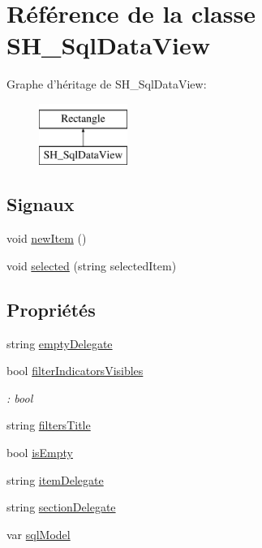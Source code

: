 \hypertarget{classSH__SqlDataView}{\section{Référence de la classe S\-H\-\_\-\-Sql\-Data\-View}
\label{classSH__SqlDataView}
}
Graphe d'héritage de S\-H\-\_\-\-Sql\-Data\-View\-:\begin{figure}[H]
\begin{center}
\leavevmode
\includegraphics[height=2.000000cm]{classSH__SqlDataView}
\end{center}
\end{figure}
\subsection*{Signaux}
\begin{DoxyCompactItemize}
\item 
void \hyperlink{classSH__SqlDataView_a8ce529551e776f86ee76d29da47f9914}{new\-Item} ()
\item 
void \hyperlink{classSH__SqlDataView_a95366e3f65b183e8c82381e90b5ddc94}{selected} (string selected\-Item)
\end{DoxyCompactItemize}
\subsection*{Propriétés}
\begin{DoxyCompactItemize}
\item 
string \hyperlink{classSH__SqlDataView_af2c0c75bb57606451699027fa74eeda2}{empty\-Delegate}
\item 
bool \hyperlink{classSH__SqlDataView_afdc0805dc2ce3af4e9ce5331a81d7e13}{filter\-Indicators\-Visibles}
\begin{DoxyCompactList}\small\item\em \-: bool \end{DoxyCompactList}\item 
string \hyperlink{classSH__SqlDataView_a96eb074075b9ba561603a081992a1cfc}{filters\-Title}
\item 
bool \hyperlink{classSH__SqlDataView_a3ceaf016d4dace986a92e2e77772bac9}{is\-Empty}
\item 
string \hyperlink{classSH__SqlDataView_a7ae6767ae8a82bd33b942c774c534a33}{item\-Delegate}
\item 
string \hyperlink{classSH__SqlDataView_a60486947b034f5fca72a2d5775ad1767}{section\-Delegate}
\item 
var \hyperlink{classSH__SqlDataView_ad538d6f1dd43a7d01c7960a74ca131dc}{sql\-Model}
\end{DoxyCompactItemize}


